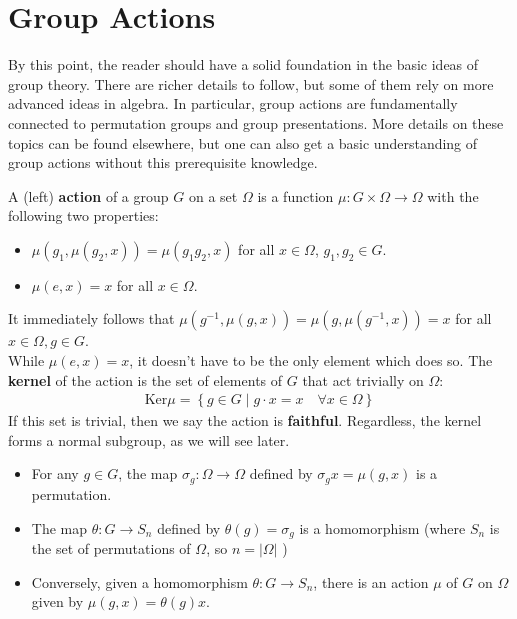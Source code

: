 \documentclass{memoir}
\begin{document}
\section{Group Actions}	

By this point, the reader should have a solid foundation in the basic ideas of group theory. There are richer details to follow, but some of them rely on more advanced ideas in algebra. In particular, group actions are fundamentally connected to permutation groups and group presentations. More details on these topics can be found elsewhere, but one can also get a basic understanding of group actions without this prerequisite knowledge.

\begin{defn}
	A (left) \textbf{action} of a group \(G\) on a set \(\Omega\) is a function \(\mu:G \times \Omega  \to \Omega\) with the following two properties:
	\begin{itemize}
		\item \(\mu(g_1,\mu(g_2,x)) = \mu(g_1g_2,x)\) for all \(x \in \Omega\), \(g_1,g_2 \in G\).
		\item \(\mu(e,x) = x\) for all \(x \in \Omega\).
	\end{itemize}
\end{defn}
It immediately follows that \(\mu(g^{-1},\mu(g,x)) = \mu(g,\mu(g^{-1},x)) = x\) for all \(x \in \Omega, g \in G\).\\

While \(\mu (e,x) = x\), it doesn't have to be the only element which does so. The \textbf{kernel} of the action is the set of elements of \(G\) that act trivially on \(\Omega \):
\begin{align*}
	\textrm{Ker}\mu  = \left\{g \in G \mid g \cdot x = x \quad \forall x \in \Omega  \right\} 
\end{align*}
If this set is trivial, then we say the action is \textbf{faithful}. Regardless, the kernel forms a normal subgroup, as we will see later.

\begin{prop}
	\begin{itemize}
		\item For any \(g \in G\), the map \(\sigma _g:\Omega\to \Omega\) defined by \(\sigma _g x = \mu(g,x)\) is a permutation.
		\item The map \(\theta:G\to S_n\) defined by \(\theta (g) = \sigma _g\) is a homomorphism (where \(S_n\) is the set of permutations of \(\Omega\), so \(n = \left| \Omega \right| \) )
		\item Conversely, given a homomorphism \(\theta:G\to S_n\), there is an action \(\mu\) of \(G\) on \(\Omega\) given by \(\mu(g,x) = \theta (g)x\).
	\end{itemize}
\end{prop}
\end{document}
